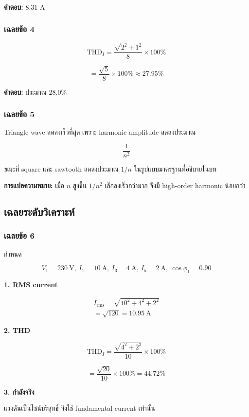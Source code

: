 \textbf{คำตอบ:} $8.31$ A

\subsubsection{เฉลยข้อ 4}

\[
\mathrm{THD}_I=\frac{\sqrt{2^2+1^2}}{8}\times100\%
\]

\[
=\frac{\sqrt5}{8}\times100\%\approx27.95\%
\]

\textbf{คำตอบ:} ประมาณ 28.0\%

\subsubsection{เฉลยข้อ 5}

Triangle wave ลดลงเร็วที่สุด เพราะ harmonic amplitude ลดลงประมาณ

\[
\frac{1}{n^2}
\]

ขณะที่ square และ sawtooth ลดลงประมาณ $1/n$ ในรูปแบบมาตรฐานที่อธิบายในบท

\textbf{การแปลความหมาย:} เมื่อ $n$ สูงขึ้น $1/n^2$ เล็กลงเร็วกว่ามาก จึงมี high-order harmonic น้อยกว่า



\subsection{เฉลยระดับวิเคราะห์}

\subsubsection{เฉลยข้อ 6}

กำหนด

\[
V_1=230\ \text{V},\ I_1=10\ \text{A},\ I_3=4\ \text{A},\ I_5=2\ \text{A},\ \cos\phi_1=0.90
\]

\textbf{1. RMS current}

\[
\begin{aligned}
    I_{\mathrm{rms}}=\sqrt{10^2+4^2+2^2} \\
    =\sqrt{120}=10.95\ \text{A}
\end{aligned}
\]

\textbf{2. THD}

\[
\mathrm{THD}_I=\frac{\sqrt{4^2+2^2}}{10}\times100\%
\]

\[
=\frac{\sqrt{20}}{10}\times100\%=44.72\%
\]

\textbf{3. กำลังจริง}

แรงดันเป็นไซน์บริสุทธิ์ จึงใช้ fundamental current เท่านั้น

